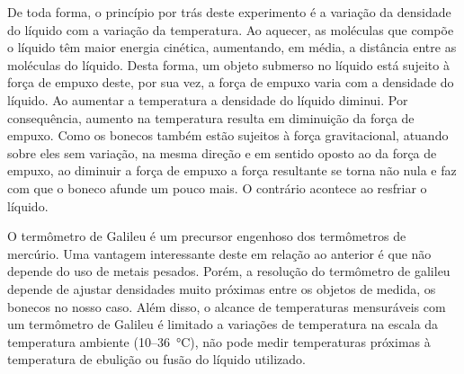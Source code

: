 De toda forma, o princípio por trás deste experimento é a variação da densidade do líquido com a variação da temperatura. Ao aquecer, as moléculas que compõe o líquido têm maior energia cinética, aumentando, em média, a distância entre as moléculas do líquido. Desta forma, um objeto submerso no líquido está sujeito à força de empuxo deste, por sua vez, a força de empuxo varia com a densidade do líquido. Ao aumentar a temperatura a densidade do líquido diminui. Por consequência, aumento na temperatura resulta em diminuição da força de empuxo. Como os bonecos também estão sujeitos à força gravitacional, atuando sobre eles sem variação, na mesma direção e em sentido oposto ao da força de empuxo, ao diminuir a força de empuxo a força resultante se torna não nula e faz com que o boneco afunde um pouco mais. O contrário acontece ao resfriar o líquido. 

O termômetro de Galileu é um precursor engenhoso dos termômetros de mercúrio. Uma vantagem interessante deste em relação ao anterior é que não depende do uso de metais pesados. Porém, a resolução do termômetro de galileu depende de ajustar densidades muito próximas entre os objetos de medida, os bonecos no nosso caso. Além disso, o alcance de temperaturas mensuráveis com um termômetro de Galileu é limitado a variações de temperatura na escala da temperatura ambiente (\qty{10}{\celsiu}--\qty{36}{\celsius}), não pode medir temperaturas próximas à temperatura de ebulição ou fusão do líquido utilizado. 
